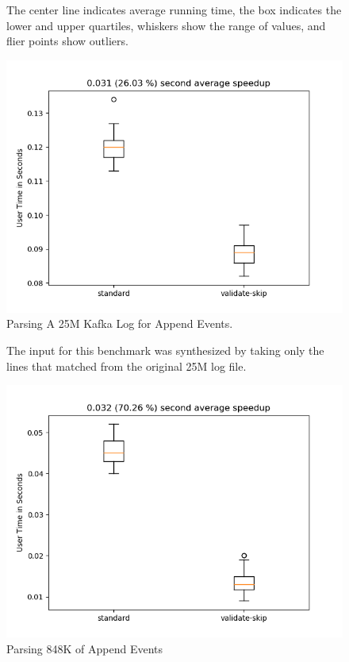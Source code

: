 \begin{figure}
\caption{Parsing A 25M Kafka Log for Append Events.}
\label{fig:append}

The center line indicates average running time, the
box indicates the lower and upper quartiles, whiskers show
the range of values, and flier points show outliers.

\includegraphics{resources/append.png}
\end{figure}

\begin{figure}
\caption{Parsing 848K of Append Events}
\label{fig:append:just:match}

The input for this benchmark was synthesized by taking
only the lines that matched from the original 25M log file.

\includegraphics{resources/append-just-match.png}
\end{figure}

